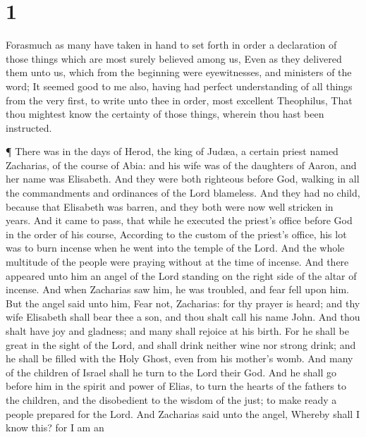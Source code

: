 \hypertarget{section}{%
\section{1}\label{section}}

 Forasmuch as many have taken in hand to set forth in order
a declaration of those things which are most surely believed among us,
 Even as they delivered them unto us, which from the
beginning were eyewitnesses, and ministers of the word;  It
seemed good to me also, having had perfect understanding of all things
from the very first, to write unto thee in order, most excellent
Theophilus,  That thou mightest know the certainty of those
things, wherein thou hast been instructed.

 ¶ There was in the days of Herod, the king of Judæa, a
certain priest named Zacharias, of the course of Abia: and his wife was
of the daughters of Aaron, and her name was Elisabeth.  And
they were both righteous before God, walking in all the commandments and
ordinances of the Lord blameless.  And they had no child,
because that Elisabeth was barren, and they both were now well stricken
in years.  And it came to pass, that while he executed the
priest's office before God in the order of his course, 
According to the custom of the priest's office, his lot was to burn
incense when he went into the temple of the Lord.  And the
whole multitude of the people were praying without at the time of
incense.  And there appeared unto him an angel of the Lord
standing on the right side of the altar of incense.  And
when Zacharias saw him, he was troubled, and fear fell upon him.
 But the angel said unto him, Fear not, Zacharias: for thy
prayer is heard; and thy wife Elisabeth shall bear thee a son, and thou
shalt call his name John.  And thou shalt have joy and
gladness; and many shall rejoice at his birth.  For he
shall be great in the sight of the Lord, and shall drink neither wine
nor strong drink; and he shall be filled with the Holy Ghost, even from
his mother's womb.  And many of the children of Israel
shall he turn to the Lord their God.  And he shall go
before him in the spirit and power of Elias, to turn the hearts of the
fathers to the children, and the disobedient to the wisdom of the just;
to make ready a people prepared for the Lord.  And
Zacharias said unto the angel, Whereby shall I know this? for I am an
